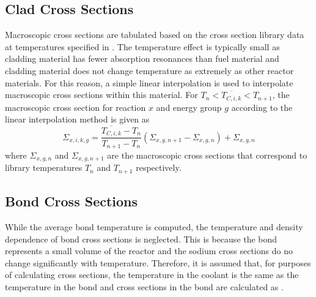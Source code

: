   \subsection{Clad Cross Sections}
    Macroscopic cross sections are tabulated based 
    on the cross section library data at temperatures specified in
    . The temperature effect is typically small as cladding
    material has fewer absorption resonances than fuel material and cladding
    material does not change temperature as extremely as other reactor
    materials. For this reason, a simple linear interpolation is used to 
    interpolate macroscopic cross sections within this material. For 
    $T_n < \overline{T_{C,i,k}} < T_{n+1}$, the macroscopic cross section for 
    reaction $x$ and energy group $g$ according to the linear interpolation 
    method is given as
    \begin{equation}
      \label{eq:xs_linear_interpolation}
      \Sigma_{x,i,k,g} = 
        \frac{\overline{T_{C,i,k}} - T_{n}}{T_{n+1}-T_{n}} 
        (\Sigma_{x,g,n+1} - \Sigma_{x,g,n})  + \Sigma_{x,g,n}
    \end{equation}
    where $\Sigma_{x,g,n}$ and $\Sigma_{x,g,n+1}$ are the macroscopic
    cross sections that correspond to library temperatures $T_n$ and $T_{n+1}$
    respectively. 

  \subsection{Bond Cross Sections}
    While the average bond temperature is computed, the temperature and density
    dependence of bond cross sections is neglected. This is because the bond 
    represents a small volume of the reactor and the sodium cross sections 
    do no change significantly with temperature. Therefore, it is assumed that,
    for purposes of calculating cross sections, the temperature in the coolant
    is the same as the temperature in the bond and cross sections in the bond
    are calculated as .

